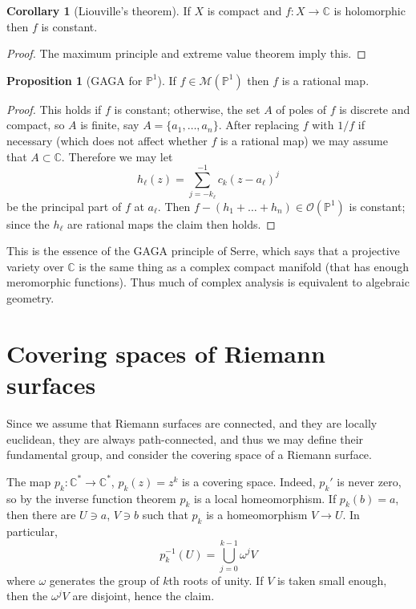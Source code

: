 \documentclass[12pt]{book}
\newcommand{\CC}{\mathbb{C}}
\newcommand{\PP}{\mathbb{P}}
\newcommand{\Mero}{\mathscr M}
\newcommand{\Olo}{\mathscr O}
\theoremstyle{definition}
\newtheorem{proposition}[theorem]{Proposition}
\newtheorem{corollary}[theorem]{Corollary}
\newenvironment{example}
  {\pushQED{\qed}\renewcommand{\qedsymbol}{$\diamondsuit$}\examplex}
  {\popQED\endexamplex}
\begin{document}
\begin{corollary}[Liouville's theorem]
If $X$ is compact and $f: X \to \CC$ is holomorphic then $f$ is constant.
\end{corollary}
\begin{proof}
The maximum principle and extreme value theorem imply this.
\end{proof}

\begin{proposition}[GAGA for $\PP^1$]
If $f \in \Mero(\PP^1)$ then $f$ is a rational map.
\end{proposition}
\begin{proof}
This holds if $f$ is constant; otherwise, the set $A$ of poles of $f$ is discrete and compact, so $A$ is finite, say $A = \{a_1, \dots, a_n\}$.
After replacing $f$ with $1/f$ if necessary (which does not affect whether $f$ is a rational map) we may assume that $A \subset \CC$.
Therefore we may let
$$h_\ell(z) = \sum_{j = -k_\ell}^{-1} c_k (z - a_\ell)^j$$
be the principal part of $f$ at $a_\ell$.
Then $f - (h_1 + \dots + h_n) \in \Olo(\PP^1)$ is constant; since the $h_\ell$ are rational maps the claim then holds.
\end{proof}

This is the essence of the GAGA principle of Serre, which says that a projective variety over $\CC$ is the same thing as a complex compact manifold (that has enough meromorphic functions).
Thus much of complex analysis is equivalent to algebraic geometry.

\section{Covering spaces of Riemann surfaces}
Since we assume that Riemann surfaces are connected, and they are locally euclidean, they are always path-connected, and thus we may define their fundamental group, and consider the covering space of a Riemann surface.

\begin{example}
The map $p_k: \CC^* \to \CC^*$, $p_k(z) = z^k$ is a covering space.
Indeed, $p_k'$ is never zero, so by the inverse function theorem $p_k$ is a local homeomorphism.
If $p_k(b) = a$, then there are $U \ni a$, $V \ni b$ such that $p_k$ is a homeomorphism $V \to U$.
In particular,
$$p_k^{-1}(U) = \bigcup_{j=0}^{k-1} \omega^j V$$
where $\omega$ generates the group of $k$th roots of unity.
If $V$ is taken small enough, then the $\omega^j V$ are disjoint, hence the claim.
\end{example}
\end{document}
